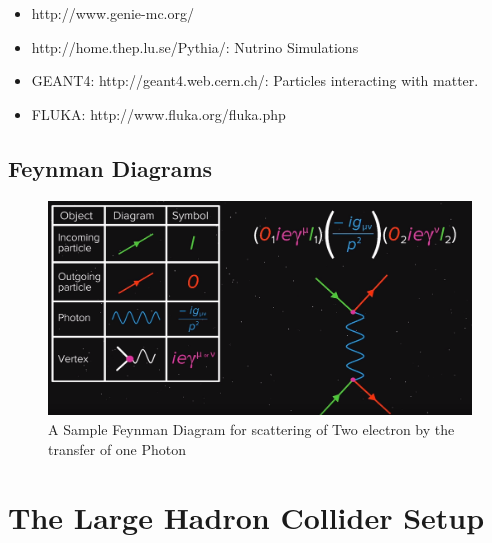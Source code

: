 \begin{itemize}
  \item http://www.genie-mc.org/
  \item http://home.thep.lu.se/Pythia/: Nutrino Simulations
  \item GEANT4: http://geant4.web.cern.ch/: Particles interacting with matter.
  \item FLUKA: http://www.fluka.org/fluka.php
\end{itemize}


\subsection{Feynman Diagrams}

\begin{figure}[H]
  \centering
  \includegraphics[width=0.8\linewidth]{img/hadron/preliminary-feynman-diagram.png}
  \caption{A Sample Feynman Diagram for scattering of Two electron by the transfer of one Photon}
  \label{fig:preliminary-feynman-diagram}
\end{figure}



\section{The Large Hadron Collider Setup}

